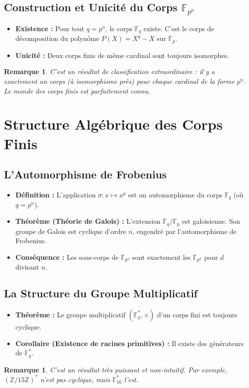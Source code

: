 \documentclass[12pt, a4paper, parskip=full]{report}
\theoremstyle{agregstyle}
\newtheorem{remark}[definition]{Remarque}
\begin{document}
\subsection{Construction et Unicité du Corps $\mathbb{F}_{p^n}$}
\begin{itemize}
    \item \textbf{Existence :} Pour tout $q=p^n$, le corps $\mathbb{F}_q$ existe. C'est le corps de décomposition du polynôme $P(X) = X^q-X$ sur $\mathbb{F}_p$.
    \item \textbf{Unicité :} Deux corps finis de même cardinal sont toujours isomorphes.
\end{itemize}
\begin{remark}
    C'est un résultat de classification extraordinaire : il y a exactement un corps (à isomorphisme près) pour chaque cardinal de la forme $p^n$. Le monde des corps finis est parfaitement connu.
\end{remark}

\section{Structure Algébrique des Corps Finis}
\subsection{L'Automorphisme de Frobenius}
\begin{itemize}
    \item \textbf{Définition :} L'application $\sigma: x \mapsto x^p$ est un automorphisme du corps $\mathbb{F}_q$ (où $q=p^n$).
    \item \textbf{Théorème (Théorie de Galois) :} L'extension $\mathbb{F}_q/\mathbb{F}_p$ est galoisienne. Son groupe de Galois est cyclique d'ordre $n$, engendré par l'automorphisme de Frobenius.
    \item \textbf{Conséquence :} Les sous-corps de $\mathbb{F}_{p^n}$ sont exactement les $\mathbb{F}_{p^d}$ pour $d$ divisant $n$.
\end{itemize}

\subsection{La Structure du Groupe Multiplicatif}
\begin{itemize}
    \item \textbf{Théorème :} Le groupe multiplicatif $(\mathbb{F}_q^*, \times)$ d'un corps fini est toujours cyclique.
    \item \textbf{Corollaire (Existence de racines primitives) :} Il existe des générateurs de $\mathbb{F}_q^*$.
\end{itemize}
\begin{remark}
    C'est un résultat très puissant et non-intuitif. Par exemple, $(\mathbb{Z}/15\mathbb{Z})^*$ n'est pas cyclique, mais $\mathbb{F}_{16}^*$ l'est.
\end{remark}
\end{document}
